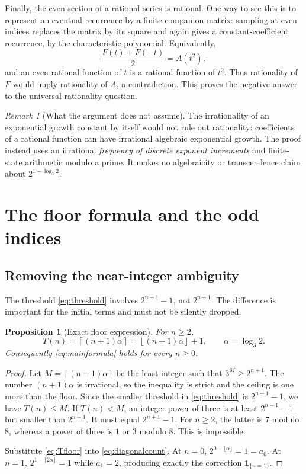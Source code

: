 \documentclass[11pt,letterpaper]{article}
\numberwithin{equation}{section}
\newtheorem{proposition}[theorem]{Proposition}
\theoremstyle{definition}
\theoremstyle{remark}
\newtheorem{remark}[theorem]{Remark}
\newcommand{\ind}[1]{\boldsymbol{1}_{\{#1\}}}
\newcommand{\floor}[1]{\left\lfloor#1\right\rfloor}
\newcommand{\ceil}[1]{\left\lceil#1\right\rceil}
\begin{document}
Finally, the even section of a rational series is rational. One way to see
this is to represent an eventual recurrence by a finite companion matrix:
sampling at even indices replaces the matrix by its square and again gives
a constant-coefficient recurrence, by the characteristic polynomial.
Equivalently,
\[
 \frac{F(t)+F(-t)}2=A(t^2),
\]
and an even rational function of $t$ is a rational function of $t^2$.
Thus rationality of $F$ would imply rationality of $A$, a contradiction.
This proves the negative answer to the universal rationality question.

\begin{remark}[What the argument does not assume]
The irrationality of an exponential growth constant by itself would not
rule out rationality: coefficients of a rational function can have
irrational algebraic exponential growth. The proof instead uses an
irrational \emph{frequency of discrete exponent increments} and finite-state
arithmetic modulo a prime. It makes no algebraicity or transcendence claim
about $2^{1-\log_3 2}$.
\end{remark}

\section{The floor formula and the odd indices}\label{sec:floor}

\subsection{Removing the near-integer ambiguity}
The threshold \eqref{eq:threshold} involves $2^{n+1}-1$, not $2^{n+1}$.
The difference is important for the initial terms and must not be silently
dropped.

\begin{proposition}[Exact floor expression]\label{prop:floor}
For $n\ge2$,
\begin{equation}\label{eq:Tfloor}
 T(n)=\ceil{(n+1)\alpha}=\floor{(n+1)\alpha}+1,
 \qquad \alpha=\log_3 2.
\end{equation}
Consequently \eqref{eq:mainformula} holds for every $n\ge0$.
\end{proposition}
\begin{proof}
Let $M=\ceil{(n+1)\alpha}$ be the least integer such that
$3^M\ge2^{n+1}$. The number $(n+1)\alpha$ is irrational, so the inequality
is strict and the ceiling is one more than the floor.
Since the smaller threshold in \eqref{eq:threshold} is $2^{n+1}-1$,
we have $T(n)\le M$. If $T(n)<M$, an integer power of three is at least
$2^{n+1}-1$ but smaller than $2^{n+1}$. It must equal $2^{n+1}-1$.
For $n\ge2$, the latter is $7$ modulo $8$, whereas a power of three is
$1$ or $3$ modulo $8$. This is impossible.

Substitute \eqref{eq:Tfloor} into \eqref{eq:diagonalcount}. At $n=0$,
$2^{0-\lfloor\alpha\rfloor}=1=a_0$. At $n=1$,
$2^{1-\lfloor2\alpha\rfloor}=1$ while $a_1=2$, producing exactly the
correction $\ind{n=1}$.
\end{proof}
\end{document}
